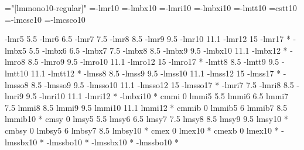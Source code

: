 

\ifx\sizespec\undefined \def\sizespec{}\fi

\ifx\regtfm\undefined  \fi
\ifx\font\corkencoded \else  \fi

\ifx\font\corkencoded {}\else {}\fi

\ifx\font\unicoded  {} 
   \font\tentt="[lmmono10-regular]"  \sizespec
\else
   \font\tenrm=\tmp-lmr10   \sizespec
   \font\tenbf=\tmp-lmbx10  \sizespec
   \font\tenit=\tmp-lmri10  \sizespec
   \font\tenbi=\tmp-lmbxi10 \sizespec
   \ifx\font\corkencoded
     \font\tentt=\tmp-lmtt10  \sizespec
   \else
     \font\tentt=cstt10 \sizespec %
   \fi
   \font\tenrmc=\tmp-lmcsc10  \sizespec
   \font\tenitc=\tmp-lmcsco10 \sizespec
\fi

\tenrm

\def\caps#1{{\escapechar=-1 \expandafter}%
  \expandafter\csname\expandafter\tenonlytext\string#1c\endcsname}
\def\tenonlytext{ten}

\ifx\font\corkencoded {}\else {}\fi

\def\exregtfm #1*{\edef\tmpa{#1*}\expandafter\regtfm\tmpa}

\exregtfm cmr 0 \tmp-lmr5 5.5 \tmp-lmr6 6.5 \tmp-lmr7 7.5 \tmp-lmr8 8.5 
              \tmp-lmr9 9.5 \tmp-lmr10 11.1 \tmp-lmr12 15 \tmp-lmr17 *
\exregtfm cmbx 0 \tmp-lmbx5 5.5 \tmp-lmbx6 6.5 \tmp-lmbx7 7.5 \tmp-lmbx8 8.5 
              \tmp-lmbx9 9.5 \tmp-lmbx10 11.1 \tmp-lmbx12 *
\exregtfm cmsl 0 \tmp-lmro8 8.5 \tmp-lmro9 9.5 \tmp-lmro10 11.1 
              \tmp-lmro12 15 \tmp-lmro17 *
\exregtfm cmtt 0 \tmp-lmtt8 8.5 \tmp-lmtt9 9.5 \tmp-lmtt10 11.1 \tmp-lmtt12 *
\exregtfm cmss 0 \tmp-lmss8 8.5 \tmp-lmss9 9.5 \tmp-lmss10 11.1 \tmp-lmss12 15 
               \tmp-lmss17 *
\exregtfm cmssi 0 \tmp-lmsso8 8.5 \tmp-lmsso9 9.5 \tmp-lmsso10 11.1
                \tmp-lmsso12 15 \tmp-lmsso17 *
\exregtfm cmti 0 \tmp-lmri7 7.5 \tmp-lmri8 8.5 \tmp-lmri9 9.5
                \tmp-lmri10 11.1 \tmp-lmri12 *
\exregtfm cmbxti 0 \tmp-lmbxi10 *
\regtfm cmmi 0 lmmi5 5.5 lmmi6 6.5 lmmi7 7.5 lmmi8 8.5 lmmi9 9.5
              lmmi10 11.1 lmmi12 *
\regtfm cmmib 0 lmmib5 6 lmmib7 8.5 lmmib10 *
\regtfm cmsy 0 lmsy5 5.5 lmsy6 6.5 lmsy7 7.5 lmsy8 8.5 lmsy9 9.5
              lmsy10 *
\regtfm cmbsy 0 lmbsy5 6 lmbsy7 8.5 lmbsy10 *  
\regtfm cmex 0 lmex10 *
\regtfm cmexb 0 lmex10 *
\exregtfm bfsans 0 \tmp-lmssbx10 *
\exregtfm bisans 0 \tmp-lmssbo10 *
\exregtfm bbfsans 0 \tmp-lmssbx10 *
\exregtfm bbisans 0 \tmp-lmssbo10 *

\normalmath

\let\lmfonts=\font  %

